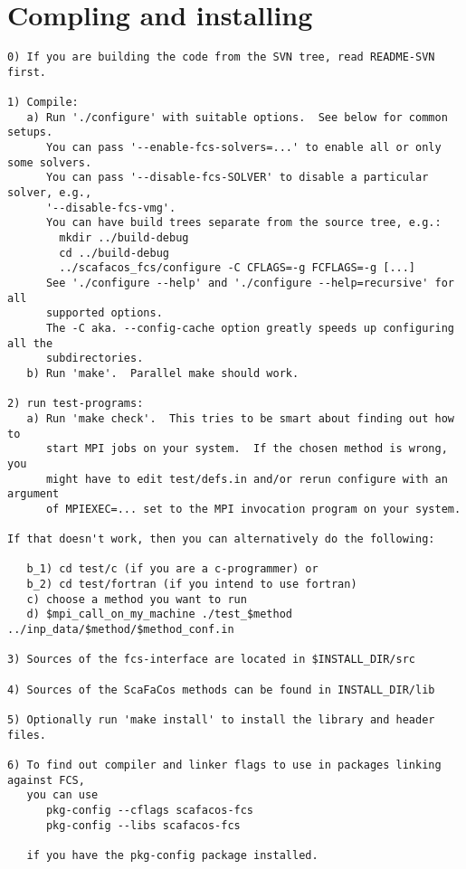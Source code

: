 \chapter{Compling and installing \fcs}
\label{cha:compiling}


\begin{verbatim}
0) If you are building the code from the SVN tree, read README-SVN first.

1) Compile:
   a) Run './configure' with suitable options.  See below for common setups.
      You can pass '--enable-fcs-solvers=...' to enable all or only some solvers.
      You can pass '--disable-fcs-SOLVER' to disable a particular solver, e.g.,
      '--disable-fcs-vmg'.
      You can have build trees separate from the source tree, e.g.:
        mkdir ../build-debug
        cd ../build-debug
        ../scafacos_fcs/configure -C CFLAGS=-g FCFLAGS=-g [...]
      See './configure --help' and './configure --help=recursive' for all
      supported options.
      The -C aka. --config-cache option greatly speeds up configuring all the
      subdirectories.
   b) Run 'make'.  Parallel make should work.

2) run test-programs:
   a) Run 'make check'.  This tries to be smart about finding out how to
      start MPI jobs on your system.  If the chosen method is wrong, you
      might have to edit test/defs.in and/or rerun configure with an argument
      of MPIEXEC=... set to the MPI invocation program on your system.

If that doesn't work, then you can alternatively do the following:

   b_1) cd test/c (if you are a c-programmer) or
   b_2) cd test/fortran (if you intend to use fortran)
   c) choose a method you want to run
   d) $mpi_call_on_my_machine ./test_$method ../inp_data/$method/$method_conf.in

3) Sources of the fcs-interface are located in $INSTALL_DIR/src

4) Sources of the ScaFaCos methods can be found in INSTALL_DIR/lib

5) Optionally run 'make install' to install the library and header files.

6) To find out compiler and linker flags to use in packages linking against FCS,
   you can use
      pkg-config --cflags scafacos-fcs
      pkg-config --libs scafacos-fcs

   if you have the pkg-config package installed.


\end{verbatim}
